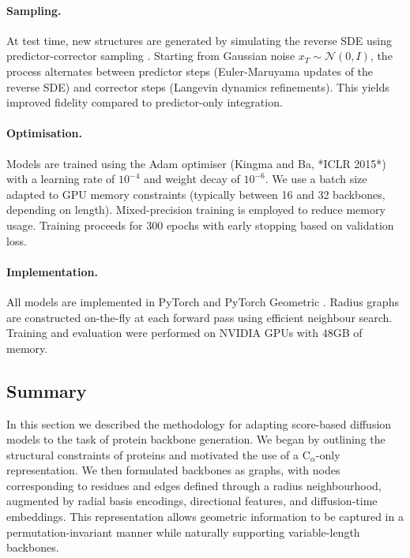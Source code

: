 \documentclass[a4paper,12pt]{article}
\begin{document}
\paragraph{Sampling.}
At test time, new structures are generated by simulating the reverse SDE using predictor-corrector sampling \cite{song2021ScoreBasedGenerativeModeling}. 
Starting from Gaussian noise \(x_T \sim \mathcal{N}(0,I)\), the process alternates between predictor steps (Euler-Maruyama updates of the reverse SDE) and corrector steps (Langevin dynamics refinements). 
This yields improved fidelity compared to predictor-only integration.

\paragraph{Optimisation.}
Models are trained using the Adam optimiser (Kingma and Ba, *ICLR 2015*) with a learning rate of \(10^{-4}\) and weight decay of \(10^{-6}\). We use a batch size adapted to GPU memory constraints (typically between 16 and 32 backbones, depending on length). Mixed-precision training is employed to reduce memory usage. Training proceeds for \(300\) epochs with early stopping based on validation loss. 

\paragraph{Implementation.}
All models are implemented in PyTorch and PyTorch Geometric \citep{PyG1.0,PyG2.0}. Radius graphs are constructed on-the-fly at each forward pass using efficient neighbour search. Training and evaluation were performed on NVIDIA GPUs with \(48\)GB of memory.

\subsection{Summary}\label{subsec:method-summary}
In this section we described the methodology for adapting score-based diffusion models to the task of protein backbone generation. We began by outlining the structural constraints of proteins and motivated the use of a C\(_\alpha\)-only representation. We then formulated backbones as graphs, with nodes corresponding to residues and edges defined through a radius neighbourhood, augmented by radial basis encodings, directional features, and diffusion-time embeddings. This representation allows geometric information to be captured in a permutation-invariant manner while naturally supporting variable-length backbones.
\end{document}
